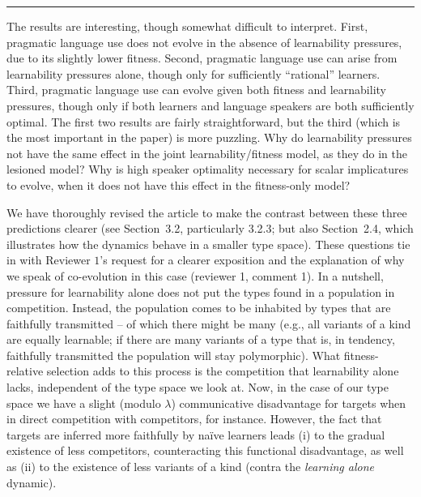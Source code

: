 \documentclass[12pt,a4paper]{article}
\begin{document}
\vspace{0.5cm}




\noindent\rule{\textwidth}{1pt}

\begin{mdframed}[backgroundcolor=gray!25,linecolor=gray!25,frametitle= Reviewer \thereviewerCounter~comment \thereviewerCommentCounter \hfill ~~({\it Interpretation of results})]
%
The results are interesting, though somewhat difficult to interpret. First, pragmatic language use does not evolve in the absence of learnability pressures, due to its slightly lower fitness. Second, pragmatic language use can arise from learnability pressures alone, though only for sufficiently ``rational'' learners. Third, pragmatic language use can evolve given both fitness and learnability pressures, though only if both learners and language speakers are both sufficiently optimal. The first two results are fairly straightforward, but the third (which is the most important in the paper) is more puzzling. Why do learnability pressures not have the same effect in the joint learnability/fitness model, as they do in the lesioned model? Why is high speaker optimality necessary for scalar implicatures to evolve, when it does not have this effect in the fitness-only model?
\end{mdframed}

We have thoroughly revised the article to make the contrast between these three predictions clearer (see Section~3.2, particularly 3.2.3; but also Section~2.4, which illustrates how the dynamics behave in a smaller type space). These questions tie in with Reviewer $1$'s request for a clearer exposition and the explanation of why we speak of co-evolution in this case (reviewer 1, comment 1). In a nutshell, pressure for learnability alone does not put the types found in a population in competition. Instead, the population comes to be inhabited by types that are faithfully transmitted -- of which there might be many (e.g., all variants of a kind are equally learnable; if there are many variants of a type that is, in tendency, faithfully transmitted the population will stay polymorphic). What fitness-relative selection adds to this process is the competition that learnability alone lacks, independent of the type space we look at. Now, in the case of our type space we have a slight (modulo $\lambda$) communicative disadvantage for targets  when in direct competition with competitors, for instance. However, the fact that targets are inferred more faithfully by na\"ive learners leads (i) to the gradual existence of less competitors, counteracting this functional disadvantage, as well as (ii) to the existence of less variants of a kind (contra the {\em learning alone} dynamic).
%
\end{document}
